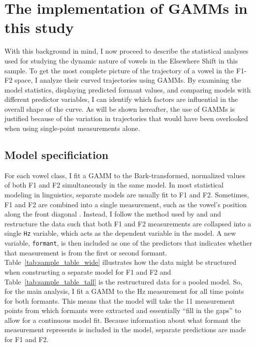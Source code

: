 \section{The implementation of GAMMs in this study}
\label{gamms_in_this_study}

With this background in mind, I now proceed to describe the statistical analyses used for studying the dynamic nature of vowels in the Elsewhere Shift in this sample. To get the most complete picture of the trajectory of a vowel in the F1-F2 space, I analyze their curved trajectories using GAMMs. By examining the model statistics, displaying predicted formant values, and comparing models with different predictor variables, I can identify which factors are influential in the overall shape of the curve. As will be shown hereafter, the use of GAMMs is justified because of the variation in trajectories that would have been overlooked when using single-point measurements alone.

\subsection{Model specificiation}

For each vowel class, I fit a GAMM to the Bark-transformed, normalized values of both F1 and F2 simultaneously in the same model. In most statistical modeling in linguistics, separate models are usually fit to F1 and F2. Sometimes, F1 and F2 are combined into a single measurement, such as the vowel's position along the front diagonal \citep{labov_etal_2013}. Instead, I follow the method used by \citet{gahl_baayen_2019} and \citet{renwick_stanley_2020} and restructure the data such that both F1 and F2 measurements are collapsed into a single \texttt{Hz} variable, which acts as the dependent variable in the model. A new variable, \texttt{formant}, is then included as one of the predictors that indicates whether that measurement is from the first or second formant. Table~\ref{tab:sample_table_wide} illustrates how the data might be structured when constructing a separate model for F1 and F2 and Table~\ref{tab:sample_table_tall} is the restructured data for a pooled model. So, for the main analysis, I fit a GAMM to the Hz measurement for all time points for both formants. This means that the model will take the 11 measurement points from which formants were extracted and essentially ``fill in the gaps'' to allow for a continuous model fit. Because information about what formant the measurement represents is included in the model, separate predictions are made for F1 and F2.

